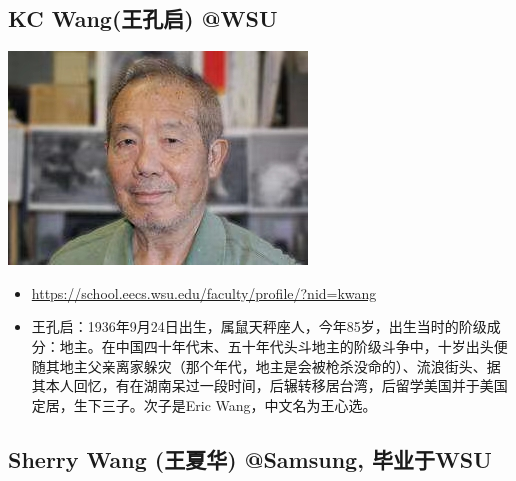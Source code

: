 \documentclass[9pt, b5paper]{article}
\begin{document}
\subsection{KC Wang(王孔启) @WSU}
\label{sec:orgb8b2d54}

\begin{center}
\includegraphics[width=.9\linewidth]{./pic/KCWang.jpg}
\end{center}
\begin{itemize}
\item \url{https://school.eecs.wsu.edu/faculty/profile/?nid=kwang}
\item 王孔启：1936年9月24日出生，属鼠天秤座人，今年85岁，出生当时的阶级成分：地主。在中国四十年代末、五十年代头斗地主的阶级斗争中，十岁出头便随其地主父亲离家躲灾（那个年代，地主是会被枪杀没命的）、流浪街头、据其本人回忆，有在湖南呆过一段时间，后辗转移居台湾，后留学美国并于美国定居，生下三子。次子是Eric Wang，中文名为王心选。
\end{itemize}
\subsection{Sherry Wang (王夏华) @Samsung, 毕业于WSU}
\label{sec:orgbd92451}
\end{document}
